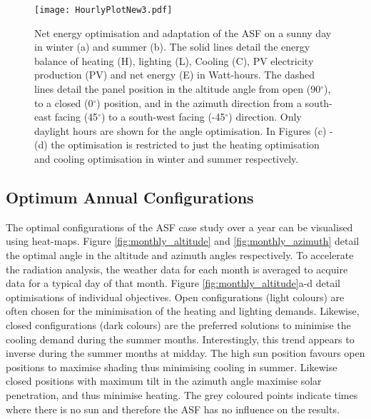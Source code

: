 \begin{figure}
\begin{center}
\texttt{[image: HourlyPlotNew3.pdf]}
\caption{Net energy optimisation and adaptation of the ASF on a sunny day in winter (a) and summer (b). The solid lines detail the energy balance of heating (H), lighting (L), Cooling (C), PV electricity production (PV) and net energy (E) in Watt-hours. The dashed lines detail the panel position in the altitude angle from open (90$^{\circ}$), to a closed (0$^{\circ}$) position, and in the azimuth direction from a south-east facing (45$^{\circ}$) to a south-west facing (-45$^{\circ}$) direction. Only daylight hours are shown for the angle optimisation. In Figures (c) - (d) the optimisation is restricted to just the heating optimisation and cooling optimisation in winter and summer respectively.}
\label{fig:transient}
\end{center}
\end{figure}

\subsection{Optimum Annual Configurations}
\label{ch:optimal}

The optimal configurations of the ASF case study over a year can be visualised using heat-maps. Figure \ref{fig:monthly_altitude} and \ref{fig:monthly_azimuth} detail the optimal angle in the altitude and azimuth angles respectively. To accelerate the radiation analysis, the weather data for each month is averaged to acquire data for a typical day of that month. Figure \ref{fig:monthly_altitude}a-d detail optimisations of individual objectives. Open configurations (light colours) are often chosen for the minimisation of the heating and lighting demands. Likewise, closed configurations (dark colours) are the preferred solutions to minimise the cooling demand during the summer months. Interestingly, this trend appears to inverse during the summer months at midday. The high sun position favours open positions to maximise shading thus minimising cooling in summer. Likewise closed positions with maximum tilt in the azimuth angle maximise solar penetration, and thus minimise heating. The grey coloured points indicate times where there is no sun and therefore the ASF has no influence on the results. 

